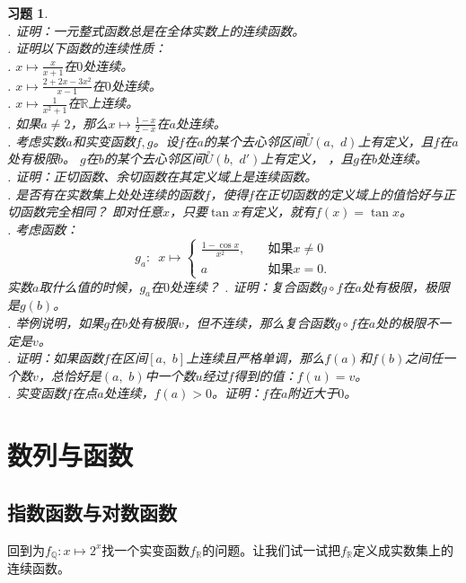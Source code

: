 \documentclass[12pt,UTF8]{ctexbook}
\newtheorem{xt}{习题}[section]
\begin{document}
\begin{xt}
    \mbox{} \\
    . 证明：一元整式函数总是在全体实数上的连续函数。\\
    . 证明以下函数的连续性质：\\
    . $x\mapsto \frac{x}{x + 1}$在$0$处连续。\\
    . $x\mapsto \frac{2 + 2x - 3x^2}{x - 1}$在$0$处连续。\\
    . $x\mapsto \frac{1}{x^2 + 1}$在$\mathbb{R}$上连续。\\
    . 如果$a\neq 2$，那么$x\mapsto \frac{1 - x}{2 - x}$在$a$处连续。\\
    . 考虑实数$a$和实变函数$f, g$。设$f$在$a$的某个去心邻区间$\overset{\circ}{U}(a,\,\,d)$上有定义，且$f$在$a$处有极限$b$。
    $g$在$b$的某个去心邻区间$\overset{\circ}{U}(b,\,\,d')$上有定义，
    ，且$g$在$b$处连续。\\
    . 证明：正切函数、余切函数在其定义域上是连续函数。\\
    . 是否有在实数集上处处连续的函数$f$，使得$f$在正切函数的定义域上的值恰好与正切函数完全相同？
    即对任意$x$，只要$\tan{x}$有定义，就有$f(x) = \tan{x}$。\\
    . 考虑函数：
    $$
        g_a: \,\,\,x \mapsto \left\{ \begin{array}{cc}
            \frac{1 - \cos{x}}{x^2},&\quad \mbox{如果}x\neq 0 \\
            a &\quad \mbox{如果}x = 0. 
        \end{array}\right.
    $$
    实数$a$取什么值的时候，$g_a$在$0$处连续？
    . 证明：复合函数$g\circ f$在$a$处有极限，极限是$g(b)$。\\
    . 举例说明，如果$g$在$b$处有极限$v$，但不连续，那么复合函数$g\circ f$在$a$处的极限不一定是$v$。\\
    . 证明：如果函数$f$在区间$[a, \,\,b]$上连续且严格单调，那么$f(a)$和$f(b)$之间任一个数$v$，总恰好是$(a, \,\,b)$中一个数$u$经过$f$得到的值：$f(u) = v$。\\
    . 实变函数$f$在点$a$处连续，$f(a)>0$。证明：$f$在$a$附近大于$0$。
\end{xt}

\section{数列与函数}
\subsection{指数函数与对数函数}
回到为$f_{\mathbb{Q}}: x\mapsto 2^x$找一个实变函数$f_{\mathbb{R}}$的问题。让我们试一试把$f_{\mathbb{R}}$定义成实数集上的连续函数。
\end{document}
